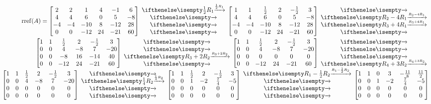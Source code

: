 \documentclass[
  letterpaper,
  DIV=11,
  numbers=noendperiod]{scrartcl}
\begin{document}
\begin{align*}
\mathrm{rref}(A) = \begin{bmatrix}2 & 2 & 1 & 4 & -1 & 6 \\ 4 & 4 & 6 & 0 & 5 & -8 \\ -4 & -4 & -10 & 8 & -12 & 28 \\ 0 & 0 & -12 & 24 & -21 & 60 \end{bmatrix} \rowops{\frac{1}{2}R_1,,,} \begin{bmatrix} 1 & 1 & \frac{1}{2} & 2 & -\frac{1}{2} & 3 \\ 4 & 4 & 6 & 0 & 5 & -8 \\ -4 & -4 & -10 & 8 & -12 & 28 \\ 0 & 0 & -12 & 24 & -21 & 60 \end{bmatrix} \rowops{,R_2-4R_1,R_3+4R_1,} \\
\begin{bmatrix} 1 & 1 & \frac{1}{2} & 2 & -\frac{1}{2} & 3 \\ 0 & 0 & 4 & -8 & 7 & -20 \\ 0 & 0 & -8 & 16 & -14 & 40 \\ 0 & 0 & -12 & 24 & -21 & 60 \end{bmatrix} \rowops{,,R_3+2R_2,} \begin{bmatrix} 1 & 1 & \frac{1}{2} & 2 & -\frac{1}{2} & 3 \\ 0 & 0 & 4 & -8 & 7 & -20 \\ 0 & 0 & 0 & 0 & 0 & 0 \\ 0 & 0 & -12 & 24 & -21 & 60 \end{bmatrix} \rowops{,,,R_4+3R_2} \\
\begin{bmatrix} 1 & 1 & \frac{1}{2} & 2 & -\frac{1}{2} & 3 \\ 0 & 0 & 4 & -8 & 7 & -20 \\ 0 & 0 & 0 & 0 & 0  & 0 \\ 0 & 0 & 0 & 0 & 0 & 0 \end{bmatrix} \rowops{,\frac{1}{4}R_2,,}\begin{bmatrix}1 & 1 & \frac{1}{2} & 2 & -\frac{1}{2} & 3 \\ 0 & 0 & 1 & -2 & \frac{7}{4} & -5 \\ 0 & 0 & 0 & 0 & 0 & 0 \\ 0 & 0 & 0 & 0 & 0 & 0 \end{bmatrix} \rowops{R_1-\frac{1}{2}R_2,,,} \begin{bmatrix} 1 & 1 & 0 & 3 & -\frac{11}{8} & \frac{11}{2} \\ 0 & 0 & 1 & -2 & \frac{7}{4} & -5 \\ 0 & 0 & 0 & 0 & 0 & 0 \\ 0 & 0 & 0 & 0 & 0 & 0 \end{bmatrix}
\end{align*}
\end{document}
